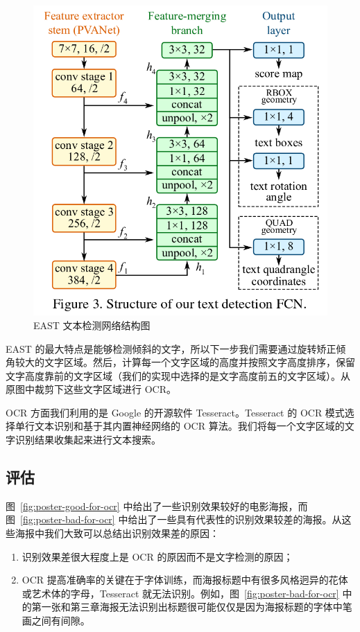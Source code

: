 \documentclass[main.tex]{subfiles}
\begin{document}
\begin{figure}[h]
    \centering
    \includegraphics[width=0.5\linewidth]{images/east_net.png}
    \caption{EAST 文本检测网络结构图 \cite{zhou2017east}}
    \label{fig:east-net}
\end{figure}

EAST 的最大特点是能够检测倾斜的文字，所以下一步我们需要通过旋转矫正倾角较大的文字区域。然后，计算每一个文字区域的高度并按照文字高度排序，保留文字高度靠前的文字区域（我们的实现中选择的是文字高度前五的文字区域）。从原图中裁剪下这些文字区域进行 OCR。

OCR 方面我们利用的是 Google 的开源软件 Tesseract。Tesseract 的 OCR 模式选择单行文本识别和基于其内置神经网络的 OCR 算法。我们将每一个文字区域的文字识别结果收集起来进行文本搜索。

\subsection{评估}

图~\ref{fig:poster-good-for-ocr} 中给出了一些识别效果较好的电影海报，而图~\ref{fig:poster-bad-for-ocr} 中给出了一些具有代表性的识别效果较差的海报。从这些海报中我们大致可以总结出识别效果差的原因：

\begin{enumerate}
    \item 识别效果差很大程度上是 OCR 的原因而不是文字检测的原因；
    \item OCR 提高准确率的关键在于字体训练，而海报标题中有很多风格迥异的花体或艺术体的字母，Tesseract 就无法识别。例如，图~\ref{fig:poster-bad-for-ocr} 中的第一张和第三章海报无法识别出标题很可能仅仅是因为海报标题的字体中笔画之间有间隙。
\end{enumerate}
\end{document}

